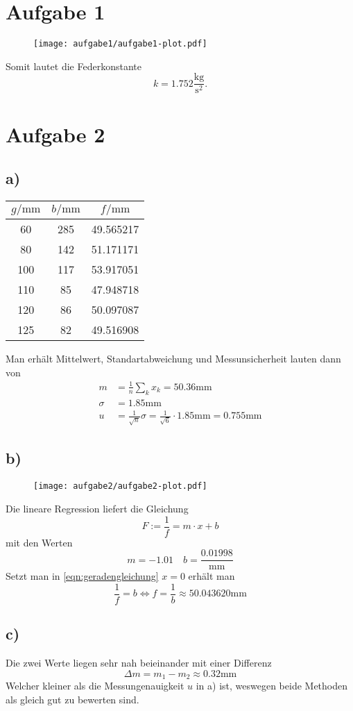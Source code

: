 \documentclass{article}
\begin{document}
\section*{Aufgabe 1}
\begin{figure}[H]
	\centering
	\texttt{[image: aufgabe1/aufgabe1-plot.pdf]}
\end{figure}
Somit lautet die Federkonstante
\[
	k = 1.752 \frac{\si{\kg}}{\si{\second^2}}.
\]

\newpage
\section*{Aufgabe 2}
\subsection*{a)}
\begin{table}
	\centering
	\begin{tabular}{c c c}
		\toprule
		$g/\si{\mm}$ & $b/\si{\mm}$ & 
		$f/\si{\mm}$ \\
		\midrule
		60	& 285	& 49.565217 \\
		80	& 142	& 51.171171 \\
		100	& 117	& 53.917051 \\
		110	& 85	& 47.948718 \\
		120	& 86	& 50.097087 \\
		125	& 82	& 49.516908 \\
		\bottomrule
	\end{tabular}
\end{table}

Man erhält Mittelwert, Standartabweichung und Messunsicherheit lauten
dann von
\begin{align*}
	m &= \frac{1}{n} \sum_k x_k =  50.36\si\mm
	\\
	\sigma &= 1.85 \si\mm
	\\
	u &= \frac{1}{\sqrt{n}} \sigma 
	= \frac{1}{\sqrt{6}} \cdot 1.85\si\mm
	= 0.755 \si\mm
\end{align*}

\subsection*{b)}

\begin{figure}[H]
	\centering
	\texttt{[image: aufgabe2/aufgabe2-plot.pdf]}
\end{figure}

Die lineare Regression liefert die Gleichung
\begin{equation}
	F := \frac{1}{f} = m\cdot x + b
	\label{eqn:geradengleichung}
\end{equation}
mit den Werten
\[
	m = -1.01 \quad b = \frac{0.01998}{\si\mm}
\]
Setzt man in \autoref{eqn:geradengleichung} $x=0$ erhält man
\[
	\frac{1}{f} = b \Leftrightarrow
	f = \frac{1}{b} \approx 50.043620 \si\mm
\]

\subsection*{c)}
Die zwei Werte liegen sehr nah beieinander mit einer Differenz
\[
	\Delta m = m_1 - m_2 \approx 0.32 \si\mm
\]
Welcher kleiner als die Messungenauigkeit $u$ in a) ist, weswegen
beide Methoden als gleich gut zu bewerten sind.
\end{document}
